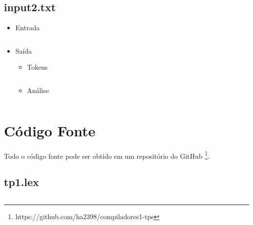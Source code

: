 \documentclass[a4paper,12pt]{report}
\begin{document}
\subsection{input2.txt}

\begin{itemize}
 \item Entrada
 
 \begin{mdframed}[linecolor=black, leftline=false, rightline=false]
    \inputminted[linenos, fontsize=\footnotesize]{text}{../src/input/wrong2.txt}
\end{mdframed}
 
 \item Saída
 
 \begin{itemize}
 	\item Tokens

	\begin{mdframed}[linecolor=black, leftline=false, rightline=false]
    \inputminted[linenos, fontsize=\footnotesize]{text}{../src/tokens2.txt}
	\end{mdframed} 	

	\item Análise

	\begin{mdframed}[linecolor=black, leftline=false, rightline=false]
    \inputminted[linenos, fontsize=\footnotesize]{text}{../src/wrong2.out}
	\end{mdframed}

 \end{itemize}
 
\end{itemize}

\section{Código Fonte}

Todo o código fonte pode ser obtido em um repositório do GitHub
\footnote{https://github.com/ha2398/compiladores1-tps}.

\subsection{tp1.lex}

\begin{mdframed}[linecolor=black, leftline=false, rightline=false]
    \inputminted[linenos, fontsize=\footnotesize]{text}{../src/tp1.lex}
\end{mdframed}
\end{document}
